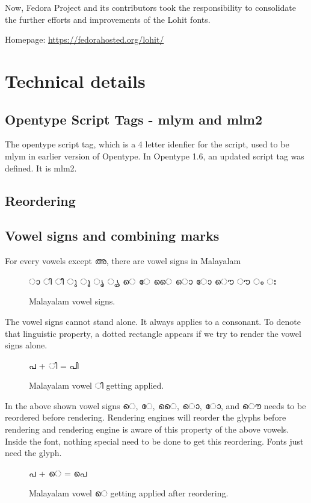 Now, Fedora Project and its contributors took the responsibility to consolidate
the further efforts and improvements of the Lohit fonts.

Homepage: {\url{https://fedorahosted.org/lohit/}}

\section{Technical details}
\subsection {Opentype Script Tags - mlym and mlm2}
The opentype script tag, which is a 4 letter idenfier for the script, used to be mlym in
earlier version of Opentype. In Opentype 1.6, an updated script tag was defined. It is mlm2.
\subsection {Reordering}
\subsection {Vowel signs and combining marks}

For every vowels except {\malayalam അ}, there are vowel signs in Malayalam

\begin{figure}[h]
  {\meera\textexample ‌ാ ി ീ ു ൂ ൃ ൄ െ േ ൈ ൊ ോ ൌ ൗ ം ഃ }\\
  \caption{Malayalam vowel signs.}
\end{figure}

The vowel signs cannot stand alone. It always applies to a consonant. To denote
that linguistic property, a dotted
rectangle appears if we try to render the vowel signs alone.

\begin{figure}[h]
  \centering
  {\meera\textexample ‌പ + ി =  പി }\\
  \caption{Malayalam vowel  {\malayalam ി} getting applied.}
\end{figure}

In the above shown vowel signs {\malayalam െ, േ, ൈ, ൊ, ോ, and ൌ } needs to be
reordered before rendering.
Rendering engines will reorder the glyphs before rendering and rendering engine
is aware of this property of the above vowels.
Inside the font, nothing special need to be done to get this reordering. Fonts
just need the glyph.

\begin{figure}[h]
  \centering
  {\meera\textexample ‌പ + െ =  പെ }\\
  \caption{Malayalam vowel  {\malayalam െ} getting applied after reordering.}
\end{figure}

